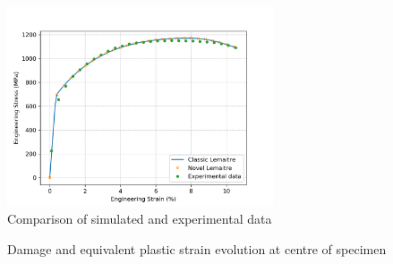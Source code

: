 \documentclass[sn-mathphys,Numbered,draft]{sn-jnl}%
\begin{document}
\begin{figure}[htb]
\begin{center}
	\includegraphics[width=0.7\textwidth]{./Figures/SimulationAndAnalysis/compareExperimentalSimulation/compareAllLemaitreExp.png}
\caption{Comparison of simulated and experimental data}
\label{fig:notchedRoundBAr}
\end{center}
\end{figure}

\begin{figure}[t!]
	\centering
		\qquad
	
	\caption{Damage and equivalent plastic strain evolution at centre of specimen}
	\label{label_for_entire_figure}
\end{figure}
\end{document}
